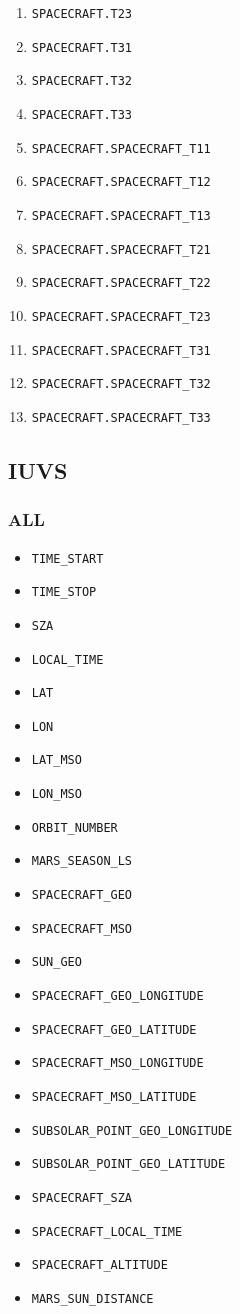 \documentclass{article}
\begin{document}
\begin{enumerate}
    \item \texttt{SPACECRAFT.T23}
    \item \texttt{SPACECRAFT.T31}
    \item \texttt{SPACECRAFT.T32}
    \item \texttt{SPACECRAFT.T33}
    \item \texttt{SPACECRAFT.SPACECRAFT\_T11}
    \item \texttt{SPACECRAFT.SPACECRAFT\_T12}
    \item \texttt{SPACECRAFT.SPACECRAFT\_T13}
    \item \texttt{SPACECRAFT.SPACECRAFT\_T21}
    \item \texttt{SPACECRAFT.SPACECRAFT\_T22}
    \item \texttt{SPACECRAFT.SPACECRAFT\_T23}
    \item \texttt{SPACECRAFT.SPACECRAFT\_T31}
    \item \texttt{SPACECRAFT.SPACECRAFT\_T32}
    \item \texttt{SPACECRAFT.SPACECRAFT\_T33}
\end{enumerate}


\subsection{IUVS}
\subsubsection{ALL}
\begin{itemize}
    \item \texttt{TIME\_START}
    \item \texttt{TIME\_STOP}
    \item \texttt{SZA}
    \item \texttt{LOCAL\_TIME}
    \item \texttt{LAT}
    \item \texttt{LON}
    \item \texttt{LAT\_MSO}
    \item \texttt{LON\_MSO}
    \item \texttt{ORBIT\_NUMBER}
    \item \texttt{MARS\_SEASON\_LS}
    \item \texttt{SPACECRAFT\_GEO}
    \item \texttt{SPACECRAFT\_MSO}
    \item \texttt{SUN\_GEO}
    \item \texttt{SPACECRAFT\_GEO\_LONGITUDE}
    \item \texttt{SPACECRAFT\_GEO\_LATITUDE}
    \item \texttt{SPACECRAFT\_MSO\_LONGITUDE}
    \item \texttt{SPACECRAFT\_MSO\_LATITUDE}
    \item \texttt{SUBSOLAR\_POINT\_GEO\_LONGITUDE}
    \item \texttt{SUBSOLAR\_POINT\_GEO\_LATITUDE}
    \item \texttt{SPACECRAFT\_SZA}
    \item \texttt{SPACECRAFT\_LOCAL\_TIME}
    \item \texttt{SPACECRAFT\_ALTITUDE}
    \item \texttt{MARS\_SUN\_DISTANCE}
\end{itemize}
\end{document}

